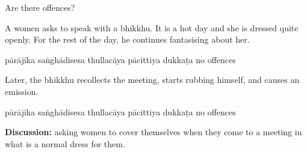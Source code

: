\begin{exam}{\autoExamName}
\begin{problem*}
  Are there offences?

\begin{parts}

\item
  A women asks to speak with a bhikkhu.
  It is a hot day and she is dressed quite openly.
  For the rest of the day, he continues fantasising about her.

  \begin{answers}{6}
    \bChoices
     pārājika\eAns
     saṅghādisesa\eAns
     thullacāya\eAns
     pācittiya\eAns
     dukkaṭa\eAns
     no offences\eAns
    \eChoices
  \end{answers}

  \bigskip

  \item Later, the bhikkhu recollects the meeting, starts rubbing himself, and causes an emission.

  \bigskip

  \begin{answers}{6}
    \bChoices
     pārājika\eAns
     saṅghādisesa\eAns
     thullacāya\eAns
     pācittiya\eAns
     dukkaṭa\eAns
     no offences\eAns
    \eChoices
  \end{answers}

  \bigskip

  \textbf{Discussion:} asking women to cover themselves when they come to a
  meeting in what is a normal dress for them.

  \bigskip

\end{parts}

\end{problem*}

\end{exam}

